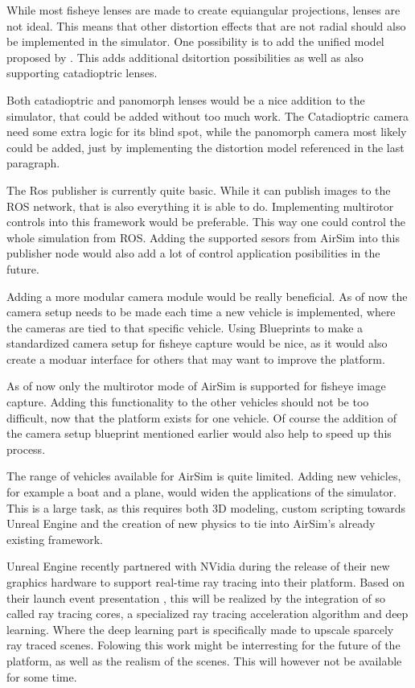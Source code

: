 While most fisheye lenses are made to create equiangular projections, lenses are not ideal. This means that other distortion effects that are not radial should also be implemented in the simulator. One possibility is to add the unified model proposed by \cite{FisheyeKalibration}. This adds additional dsitortion possibilities as well as also supporting catadioptric lenses.

Both catadioptric and panomorph lenses would be a nice addition to the simulator, that could be added without too much work. The Catadioptric camera need some extra logic for its blind spot, while the panomorph camera most likely could be added, just by implementing the distortion model referenced in the last paragraph.

The Ros publisher is currently quite basic. While it can publish images to the ROS network, that is also everything it is able to do. Implementing multirotor controls into this framework would be preferable. This way one could control the whole simulation from ROS. Adding the supported sesors from AirSim into this publisher node would also add a lot of control application posibilities in the future.

Adding a more modular camera module would be really beneficial. As of now the camera setup needs to be made each time a new vehicle is implemented, where the cameras are tied to that specific vehicle. Using Blueprints to make a standardized camera setup for fisheye capture would be nice, as it would also create a moduar interface for others that may want to improve the platform.

As of now only the multirotor mode of AirSim is supported for fisheye image capture. Adding this functionality to the other vehicles should not be too difficult, now that the platform exists for one vehicle. Of course the addition of the camera setup blueprint mentioned earlier would also help to speed up this process.

The range of vehicles available for AirSim is quite limited. Adding new vehicles, for example a boat and a plane, would widen the applications of the simulator. This is a large task, as this requires both 3D modeling, custom scripting towards Unreal Engine and the creation of new physics to tie into AirSim's already existing framework.

Unreal Engine recently partnered with NVidia during the release of their new graphics hardware to support real-time ray tracing into their platform. Based on their launch event presentation \cite{NvidiaConference}, this will be realized by the integration of so called ray tracing cores, a specialized ray tracing acceleration algorithm and deep learning. Where the deep learning part is specifically made to upscale sparcely ray traced scenes. Folowing this work might be interresting for the future of the platform, as well as the realism of the scenes. This will however not be available for some time.



